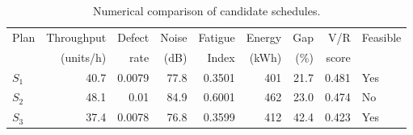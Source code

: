 \begin{table}[htbp]
\centering
\caption{Numerical comparison of candidate schedules.}
\label{tab:numerical-sim}
\small
\begin{tabular}{@{}lrrrrrrrl@{}}
\toprule
Plan & Throughput & Defect & Noise & Fatigue & Energy & Gap & V/R & Feasible \\
     & (units/h)  & rate   & (dB)  & Index   & (kWh)  & (\%) & score &         \\
\midrule
$S_{1}$ & 40.7 & 0.0079 & 77.8 & 0.3501 & 401 & 21.7 & 0.481 & Yes \\
$S_{2}$ & 48.1 & 0.01 & 84.9 & 0.6001 & 462 & 23.0 & 0.474 & No \\
$S_{3}$ & 37.4 & 0.0078 & 76.8 & 0.3599 & 412 & 42.4 & 0.423 & Yes \\
\bottomrule
\end{tabular}
\end{table}
